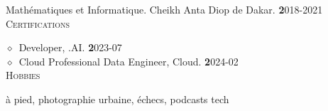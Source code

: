 \documentclass[11pt,a4paper]{article}
\newcommand{\dates}[1]{\hfill\mbox{\textbf{#1}}}
\newcommand{\smaller}[1]{{\small$\diamond$\ #1}}
\newcommand{\headright}[1]{\vspace*{2.5ex}\textsc{\Large\color{cvblue}#1}\par%
     \vspace*{-2ex}{\color{cvblue}\hrulefill}\par}
\begin{document}
\begin{minipage}[t]{0.56\textwidth}
\textscLicence Mathématiques et Informatique.  Cheikh Anta Diop de Dakar. \dates2018-2021 \\


\headright{Certifications}

\smaller{\textscTensorFlow Developer}, \textitDeepLearning.AI. \dates2023-07 \\

\smaller{\textscGoogle Cloud Professional Data Engineer}, \textitGoogle Cloud. \dates2024-02 \\


\headright{Hobbies}
\textitCourse à pied, photographie urbaine, échecs, podcasts tech

\end{minipage}
\end{document}
